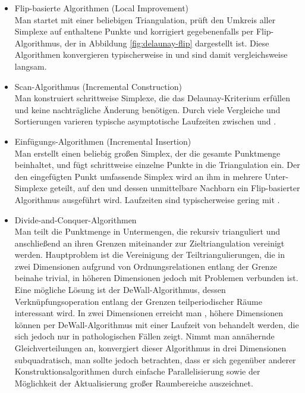 \begin{itemize}
\item Flip-basierte Algorithmen (Local Improvement)\\
  Man startet mit einer beliebigen Triangulation, prüft den Umkreis aller Simplexe auf enthaltene Punkte und korrigiert gegebenenfalls per Flip-Algorithmus, der in Abbildung \ref{fig:delaunay-flip} dargestellt ist.
  Diese Algorithmen konvergieren typischerweise in  und sind damit vergleichsweise langsam.

\item Scan-Algorithmus (Incremental Construction)\\
  Man konstruiert schrittweise Simplexe, die das Delaunay-Kriterium erfüllen und keine nachträgliche Änderung benötigen.
  Durch viele Vergleiche und Sortierungen varieren typische asymptotische Laufzeiten zwischen  und .

\item Einfügungs-Algorithmen (Incremental Insertion)\\
  Man erstellt einen beliebig großen Simplex, der die gesamte Punktmenge beinhaltet, und fügt schrittweise einzelne Punkte in die Triangulation ein.
  Der den eingefügten Punkt umfassende Simplex wird an ihm in mehrere Unter-Simplexe geteilt, auf den und dessen unmittelbare Nachbarn ein Flip-basierter Algorithmus ausgeführt wird.
  Laufzeiten sind typischerweise gering mit .

\item Divide-and-Conquer-Algorithmen\\
  Man teilt die Punktmenge in Untermengen, die rekursiv trianguliert und anschließend an ihren Grenzen miteinander zur Zieltriangulation vereinigt werden.
  Hauptproblem ist die Vereinigung der Teiltriangulierungen, die in zwei Dimensionen aufgrund von Ordnungsrelationen entlang der Grenze beinahe trivial, in höheren Dimensionen jedoch mit Problemen verbunden ist.
  Eine mögliche Lösung ist der DeWall-Algorithmus\cite{cignoni_1998}, dessen Verknüpfungsoperation entlang der Grenzen teilperiodischer Räume interessant wird.
  In zwei Dimensionen erreicht man , höhere Dimensionen können per DeWall-Algorithmus mit einer Laufzeit von  behandelt werden, die sich jedoch nur in pathologischen Fällen zeigt.
  Nimmt man annähernde Gleichverteilungen an, konvergiert dieser Algorithmus in drei Dimensionen subquadratisch, man sollte jedoch betrachten, dass er sich gegenüber anderer Konstruktionsalgorithmen durch einfache Parallelisierung sowie der Möglichkeit der Aktualisierung großer Raumbereiche auszeichnet.


\end{itemize}
